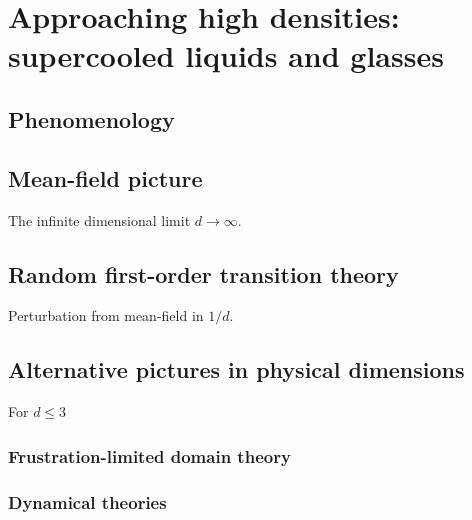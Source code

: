 \section{Approaching high densities: supercooled liquids and glasses}
\subsection{Phenomenology}
\subsection{Mean-field picture}
The infinite dimensional limit $d \to \infty$.

\subsection{Random first-order transition theory}
Perturbation from mean-field in $1/d$.

\subsection{Alternative pictures in physical dimensions}
For $d \le 3$
\subsubsection{Frustration-limited domain theory}
\subsubsection{Dynamical theories}
